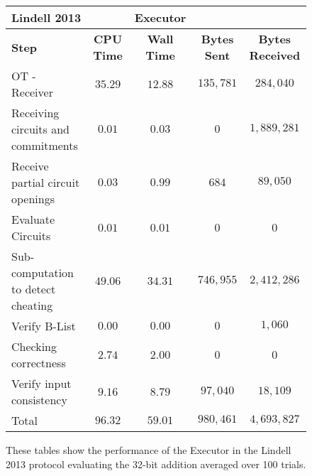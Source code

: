 \documentclass[ %
                    author={Nicholas Tutte},
                supervisor={Prof. Nigel Smart},
                    degree={MEng},
                     title={Secure Two Party Computation},
                  subtitle={A practical comparison of recent protocols},
                      type={Research - GG1K},
                      year={2015} ]{dissertation}
\begin{document}
				\begin{figure}
					\begin{tabular}{| p{3.5cm} | c c c c |}
						\hline
						\textbf{Lindell 2013} & & \textbf{Executor} & & \\
						\hline
						\textbf{Step} & \textbf{CPU Time} & \textbf{Wall Time} & \textbf{Bytes Sent} & \textbf{Bytes Received} \\
						\thickhline
						OT - Receiver & $35.29$ & $12.88$ & $135,781$ & $284,040$ \\
						\hline
						Receiving circuits and commitments & $0.01$ & $0.03$ & $0$ & $1,889,281$ \\
						\hline
						Receive partial circuit openings & $0.03$ & $0.99$ & $684$ & $89,050$ \\
						\hline
						Evaluate Circuits & $0.01$ & $0.01$ & $0$ & $0$ \\
						\hline
						Sub-computation to detect cheating & $49.06$ & $34.31$ & $746,955$ & $2,412,286$ \\
						\hline
						Verify B-List & $0.00$ & $0.00$ & $0$ & $1,060$ \\
						\hline
						Checking correctness & $2.74$ & $2.00$ & $0$ & $0$ \\
						\hline
						Verify input consistency & $9.16$ & $8.79$ & $97,040$ & $18,109$ \\
						\thickhline
						Total & $96.32$ & $59.01$ & $980,461$ & $4,693,827$ \\
						\hline
					\end{tabular}
					\caption{These tables show the performance of the Executor in the Lindell 2013 protocol evaluating the 32-bit addition averaged over 100 trials. \label{table:L_2013_Add_Executor}}
				\end{figure}
\end{document}
